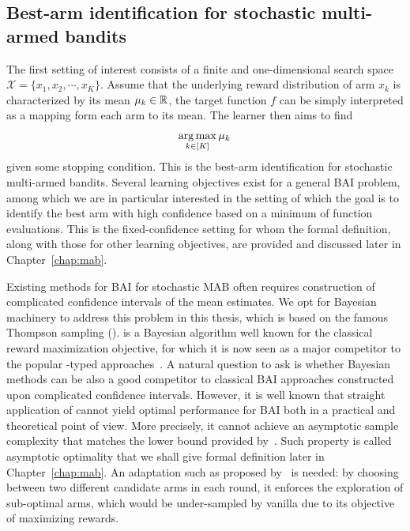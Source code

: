 \subsection{Best-arm identification for stochastic multi-armed bandits}\label{sec:intro.mab.bai}

The first setting of interest consists of a finite and one-dimensional search space $\mathcal{X} = \{x_1,x_2,\cdots,x_K\}$. Assume that the underlying reward distribution of arm $x_k$ is characterized by its mean $\mu_k\in\mathbb{R}$, the target function $f$ can be simply interpreted as a mapping form each arm to its mean. The learner then aims to find
\begin{align}\label{eq:optim_bai}
    \operatorname*{arg\,max}_{k\in[K]} \mu_k\,
\end{align}
given some stopping condition. This is the best-arm identification for stochastic multi-armed bandits. Several learning objectives exist for a general BAI problem, among which we are in particular interested in the setting of which the goal is to identify the best arm with high confidence based on a minimum of function evaluations. This is the \gls{fixed-confidence setting} for whom the formal definition, along with those for other learning objectives, are provided and discussed later in Chapter~\ref{chap:mab}.

Existing methods for BAI for stochastic MAB often requires construction of complicated confidence intervals of the mean estimates. We opt for Bayesian machinery to address this problem in this thesis, which is based on the famous Thompson sampling (\TS). \TS is a Bayesian algorithm well known for the classical reward maximization objective, for which it is now seen as a major competitor to the popular \UCB-typed approaches~\citep{auer2002ucb}. A natural question to ask is whether Bayesian methods can be also a good competitor to classical BAI approaches constructed upon complicated confidence intervals. However, it is well known that straight application of \TS cannot yield optimal performance for BAI both in a practical and theoretical point of view. More precisely, it cannot achieve an asymptotic \gls{sample complexity} that matches the lower bound provided by~\cite{garivier2016tracknstop}. Such property is called \gls{asymptotic optimality} that we shall give formal definition later in Chapter~\ref{chap:mab}. An adaptation such as \TTTS proposed by~\cite{russo2016ttts} is needed: by choosing between two different candidate arms in each round, it enforces the exploration of sub-optimal arms, which would be under-sampled by vanilla \TS due to its objective of maximizing rewards. 

